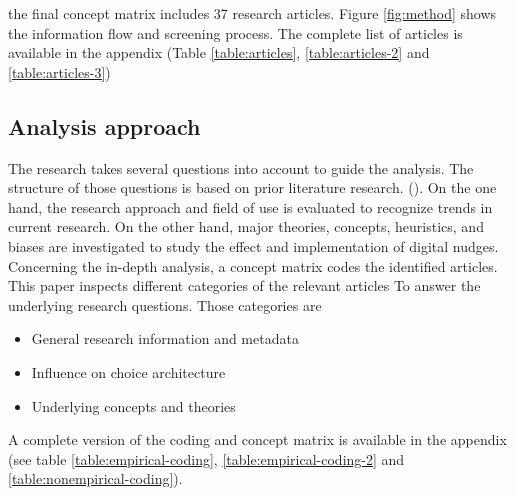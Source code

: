 the final concept matrix includes 37 research articles. Figure \ref{fig:method} shows the information flow and screening process. The complete list of articles is available in the appendix (Table \ref{table:articles}, \ref{table:articles-2} and \ref{table:articles-3})

\subsection{Analysis approach}
The research takes several questions into account to guide the analysis. The structure of those questions is based on prior literature research. (\cite{alavi_review_1992}). On the one hand, the research approach and field of use is evaluated to recognize trends in current research. On the other hand, major theories, concepts, heuristics, and biases are investigated to study the effect and implementation of digital nudges.
Concerning the in-depth analysis, a concept matrix codes the identified articles. This paper inspects different categories of the relevant articles To answer the underlying research questions. Those categories are 
\begin{itemize}
\item General research information and metadata
\item Influence on choice architecture
\item Underlying concepts and theories
\end{itemize}

A complete version of the coding and concept matrix is available in the appendix (see table \ref{table:empirical-coding}, \ref{table:empirical-coding-2} and \ref{table:nonempirical-coding}).